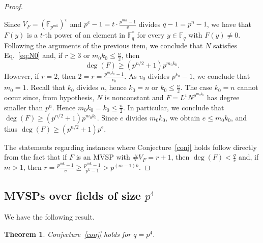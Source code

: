 \documentclass[11pt]{amsart}
\newcommand{\F}{\mathbb{F}}
\newtheorem{theorem}{Theorem}[section]
\theoremstyle{definition}
\theoremstyle{remark}
\begin{document}
\begin{proof}
\begin{itemize}
Since  $V_F=\left(\F_{p^{mk}}\right)^v$ and $p^e-1=t\cdot \frac{p^{mk}-1}{v}$ divides $q-1=p^n-1$, we have that $F(y)$ is a $t$-th power of an element in $\F_q^*$ for every $y\in \F_q$ with $F(y)\ne 0$. Following the arguments of the previous item, we conclude that $N$ satisfies Eq.~\eqref{eq:N0} and, if $r\ge 3$ or $m_0k_0\le \frac{n}{2}$, then \begin{equation}\label{eq:low}\deg(F)\ge (p^{n/2}+1)p^{m_0k_0}.\end{equation} 
However, if $r=2$,  then $2=r=\frac{p^{m_0k_0}-1}{v_0}$. As $v_0$ divides $p^{k_0}-1$, we conclude that $m_0=1$. Recall that $k_0$ divides $n$, hence $k_0=n$ or $k_0\le \frac{n}{2}$. The case $k_0=n$ cannot occur since, from hypothesis, $N$ is nonconstant and $F=L^vN^{p^{m_0k_0}}$ has degree smaller than $p^n$. Hence $m_0k_0=k_0\le \frac{n}{2}$. 
In particular, we conclude that $\deg(F)\ge (p^{n/2}+1)p^{m_0k_0}$. Since $e$ divides $m_0k_0$, we obtain $e\le m_0k_0$, and thus $\deg(F)\ge (p^{n/2}+1)p^{e}$. 
\end{itemize}
The statements regarding instances where Conjecture~\ref{conj} holds follow directly from the fact that if $F$ is an MVSP with $\# V_F=r+1$, then $\deg(F)<\frac{q}{r}$ and, if $m>1$, then $r=\frac{p^{mk}-1}{v}\ge \frac{p^{mk}-1}{p^k-1}>p^{(m-1)k}$.
\end{proof}


\subsection{MVSPs over fields of size $p^4$}
We have the following result.


\begin{theorem}\label{thm:p4-a}
 Conjecture~\ref{conj} holds for $q=p^4$. 
\end{theorem}
\end{document}
